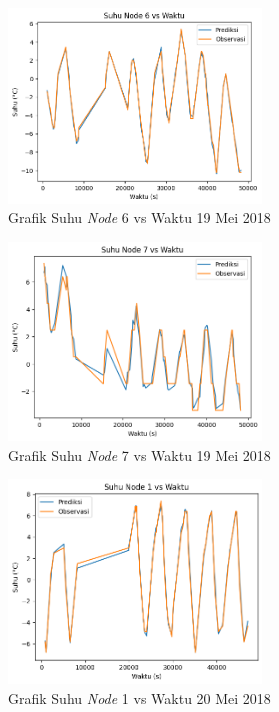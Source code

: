 \begin{figure}[H]
\setlength{}
\begin{center}
\includegraphics[width=0.6\textwidth]{fig/node6_temp_2018-05-19.png}
	\caption{Grafik Suhu \textit{Node} 6 vs Waktu 19 Mei 2018}
\label{fig:node619}
\end{center}
\end{figure}

\begin{figure}[H]
\setlength{}
\begin{center}
\includegraphics[width=0.6\textwidth]{fig/node7_temp_2018-05-19.png}
\caption{Grafik Suhu \textit{Node} 7 vs Waktu 19 Mei 2018}
\label{fig:node719}
\end{center}
\end{figure}

\begin{figure}[H]
\setlength{}
\begin{center}
\includegraphics[width=0.6\textwidth]{fig/node1_temp_2018-05-20.png}
\caption{Grafik Suhu \textit{Node} 1 vs Waktu 20 Mei 2018}
\label{fig:node120}
\end{center}
\end{figure}

